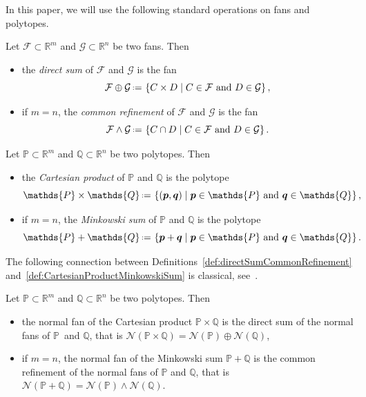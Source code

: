 \documentclass[AHL,Unicode,longabstracts,published]{cedram}
\newcommand{\R}{\mathbb{R}}
\renewcommand{\c}[1]{\mathcal{#1}}
\renewcommand{\b}[1]{\boldsymbol{#1}}
\newcommand{\set}[2]{\left\{ #1 \;\middle|\; #2 \right\}}
\newcommand{\eqdef}{\mbox{\,\raisebox{0.2ex}{\scriptsize\ensuremath{\mathrm:}}\ensuremath{=}\,}}
\newcommand{\polytope}[1]{\mathds{#1}}
\begin{document}
In this paper, we will use the following standard operations on fans and polytopes.

\begin{defi}\label{def:directSumCommonRefinement}
Let $\c{F} \subset \R^m$ and $\c{G} \subset \R^n$ be two fans. Then
\begin{itemize}
\item the
\emph{direct sum} of $\c{F}$ and $\c{G}$ is the fan
\[
\c{F} \oplus \c{G} \eqdef \set{C \times D}{C \in \c{F} \text{ and } D \in \c{G}},
\]
\item if $m = n$, the
\emph{common refinement} of $\c{F}$ and $\c{G}$ is the fan
\[
\c{F} \wedge \c{G} \eqdef \set{C \cap D}{C \in \c{F} \text{ and } D \in \c{G}}.
\]
\end{itemize}
\end{defi}

\begin{defi}\label{def:CartesianProductMinkowskiSum}
Let $\polytope{P} \subset \R^m$ and $\polytope{Q} \subset \R^n$ be two polytopes. Then
\begin{itemize}
\item the
\emph{Cartesian product} of $\polytope{P}$ and $\polytope{Q}$ is the polytope
\[
\polytope{P} \times \polytope{Q} \eqdef \set{(\b{p},\b{q})}{\b{p} \in \polytope{P} \text{ and } \b{q} \in \polytope{Q}},
\]
\item if $m = n$, the
\emph{Minkowski sum} of $\polytope{P}$ and $\polytope{Q}$ is the polytope
\[
\polytope{P} + \polytope{Q} \eqdef \set{\b{p}+\b{q}}{\b{p} \in \polytope{P} \text{ and } \b{q} \in \polytope{Q}}.
\]
\end{itemize}
\end{defi}

The following connection between Definitions~\ref{def:directSumCommonRefinement} and~\ref{def:CartesianProductMinkowskiSum} is classical, see~\cite[Lems.~7.7 \& 7.12]{Ziegler-polytopes}.

\begin{prop}\label{prop:CartesianProductMinkowskiSum}
Let $\polytope{P} \subset \R^m$ and $\polytope{Q} \subset \R^n$ be two polytopes. Then
\begin{itemize}
\item the normal fan of the Cartesian product $\polytope{P} \times \polytope{Q}$ is the direct sum of the normal fans of $\polytope{P}$~and $\polytope{Q}$, that is $\c{N}(\polytope{P} \times \polytope{Q}) = \c{N}(\polytope{P}) \oplus \c{N}(\polytope{Q})$,
\item if $m = n$, the normal fan of the Minkowski sum $\polytope{P} + \polytope{Q}$ is the common refinement of the normal fans of $\polytope{P}$ and $\polytope{Q}$, that is $\c{N}(\polytope{P} + \polytope{Q}) = \c{N}(\polytope{P}) \wedge \c{N}(\polytope{Q})$.
\end{itemize}
\end{prop}
\end{document}
